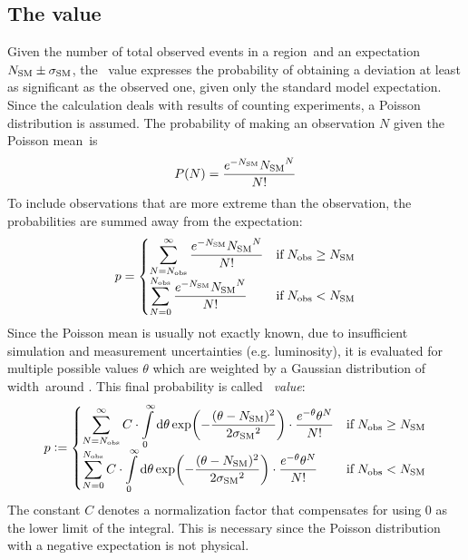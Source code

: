 \subsection{The \p value}
Given the number of total observed events in a region~\Ndata and an expectation~${N_\mathrm{SM}} \pm {\sigma_\mathrm{SM}}$, the \p~value expresses the probability of obtaining a deviation at least as significant as the observed one, given only the standard model expectation.
Since the calculation deals with results of counting experiments, a Poisson distribution is assumed. The probability of making an observation $N$ given the Poisson mean~\Nmc is
\begin{equation}
	P(N) = \frac{e^{-{N_\mathrm{SM}}} {N_\mathrm{SM}}^N}{N!}
\end{equation}
To include observations that are more extreme than the observation, the probabilities are summed away from the expectation:
\begin{equation}
p = 
	\begin{cases} 
		\displaystyle
		\sum\limits_{N = {N_\mathrm{obs}}}^{\infty} \frac{e^{-{N_\mathrm{SM}}} {N_\mathrm{SM}}^N}{N!} &\mbox{if} \; {N_\mathrm{obs}} \geq {N_\mathrm{SM}} \\
		\displaystyle
		\sum\limits_{N = 0}^{{N_\mathrm{obs}}} \frac{e^{-{N_\mathrm{SM}}} {N_\mathrm{SM}}^N}{N!} &\mbox{if} \; {N_\mathrm{obs}} < {N_\mathrm{SM}}
	\end{cases}
\end{equation}
Since the Poisson mean is usually not exactly known, due to insufficient simulation and measurement uncertainties (e.g. luminosity), it is evaluated for multiple possible values $\theta$ which are weighted by a Gaussian distribution of width~\sigmamc around \Nmc. This final probability is called \emph{\p~value}:
\begin{equation}
p \vcentcolon= 
	\begin{cases} 
		\displaystyle
		\sum\limits_{N = {N_\mathrm{obs}}}^{\infty} C \cdot \int\limits_0^\infty \dd \theta \exp(-\frac{(\theta-{N_\mathrm{SM}})^2}{2 {\sigma_\mathrm{SM}}^2}) \cdot \frac{e^{-\theta} \theta^N}{N!} &\mbox{if} \; {N_\mathrm{obs}} \geq {N_\mathrm{SM}} \\
		\displaystyle
		\sum\limits_{N = 0}^{{N_\mathrm{obs}}} C \cdot \int\limits_0^\infty \dd \theta \exp(-\frac{(\theta-{N_\mathrm{SM}})^2}{2 {\sigma_\mathrm{SM}}^2}) \cdot \frac{e^{-\theta} \theta^N}{N!} &\mbox{if} \; {N_\mathrm{obs}} < {N_\mathrm{SM}}
	\end{cases}
\end{equation}
The constant $C$ denotes a normalization factor that compensates for using $0$ as the lower limit of the integral. This is necessary since the Poisson distribution with a negative expectation is not physical.

